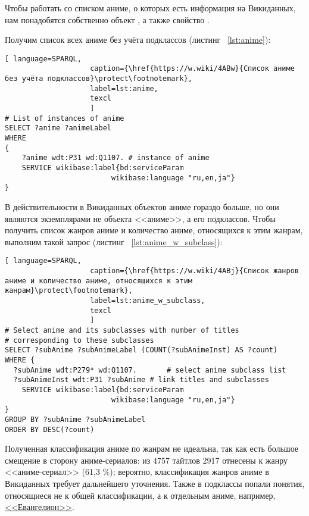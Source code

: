 Чтобы работать со списком аниме, о которых есть информация на Викиданных, нам понадобятся собственно объект , а также свойство .

Получим список всех аниме без учёта подклассов (листинг ~\protect\ref{lst:anime}):

\begin{lstlisting}[ language=SPARQL, 
                    caption={\href{https://w.wiki/4ABw}{Список аниме без учёта подклассов}\protect\footnotemark},
                    label=lst:anime,
                    texcl 
                    ]
# List of instances of anime
SELECT ?anime ?animeLabel
WHERE
{
    ?anime wdt:P31 wd:Q1107. # instance of anime
    SERVICE wikibase:label{bd:serviceParam
					     wikibase:language "ru,en,ja"}
}
\end{lstlisting}%

В действительности в Викиданных объектов аниме гораздо больше, но они являются экземплярами не объекта <<аниме>>, а его подклассов. Чтобы получить список жанров аниме и количество аниме, относящихся к этим жанрам, выполним такой запрос (листинг ~\protect\ref{lst:anime_w_subclass}):

\begin{lstlisting}[ language=SPARQL, 
                    caption={\href{https://w.wiki/4ABj}{Список жанров аниме и количество аниме, относящихся к этим жанрам}\protect\footnotemark},
                    label=lst:anime_w_subclass,
                    texcl 
                    ]
# Select anime and its subclasses with number of titles
# corresponding to these subclasses
SELECT ?subAnime ?subAnimeLabel (COUNT(?subAnimeInst) AS ?count)
WHERE {
  ?subAnime wdt:P279* wd:Q1107.       # select anime subclass list
  ?subAnimeInst wdt:P31 ?subAnime # link titles and subclasses
    SERVICE wikibase:label{bd:serviceParam
					     wikibase:language "ru,en,ja"}
}
GROUP BY ?subAnime ?subAnimeLabel
ORDER BY DESC(?count)
\end{lstlisting}%

Полученная классификация аниме по жанрам не идеальна, так как есть большое смещение в сторону аниме-сериалов: из 4757 тайтлов 2917 отнесены к жанру <<аниме-сериал>> (61,3 \%); вероятно, классификация жанров аниме в Викиданных требует дальнейшего уточнения. Также в подклассы попали понятия, относящиеся не к общей классификации, а к отдельным аниме, например, \href{https://clck.ru/9cFfS}{<<Евангелион>>}.

